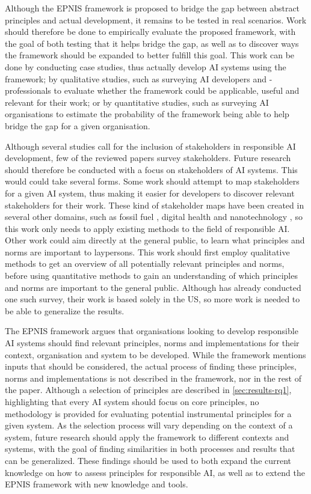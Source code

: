 Although the EPNIS framework is proposed to bridge the gap between abstract principles and actual development, it remains to be tested in real scenarios. Work should therefore be done to empirically evaluate the proposed framework, with the goal of both testing that it helps bridge the gap, as well as to discover ways the framework should be expanded to better fulfill this goal. This work can be done by conducting case studies, thus actually develop AI systems using the framework; by qualitative studies, such as surveying AI developers and -professionals to evaluate whether the framework could be applicable, useful and relevant for their work; or by quantitative studies, such as surveying AI organisations to estimate the probability of the framework being able to help bridge the gap for a given organisation.


Although several studies call for the inclusion of stakeholders in responsible AI development, few of the reviewed papers survey stakeholders. Future research should therefore be conducted with a focus on stakeholders of AI systems. This would could take several forms. Some work should attempt to map stakeholders for a given AI system, thus making it easier for developers to discover relevant stakeholders for their work. These kind of stakeholder maps have been created in several other domains, such as fossil fuel \parencite{Yudha_2018_stakeholdermap}, digital health \parencite{An_2022_stakeholdermap} and nanotechnology \parencite{Hansen_2010_stakeholdermap}, so this work only needs to apply existing methods to the field of responsible AI. Other work could aim directly at the general public, to learn what principles and norms are important to laypersons. This work should first employ qualitative methods to get an overview of all potentially relevant principles and norms, before using quantitative methods to gain an understanding of which principles and norms are important to the general public. Although \textcite{Jakesch_2022} has already conducted one such survey, their work is based solely in the US, so more work is needed to be able to generalize the results.

The EPNIS framework argues that organisations looking to develop responsible AI systems should find relevant principles, norms and implementations for their context, organisation and system to be developed. While the framework mentions inputs that should be considered, the actual process of finding these principles, norms and implementations is not described in the framework, nor in the rest of the paper. Although a selection of principles are described in \autoref{sec:results-rq1}, highlighting that every AI system should focus on core principles, no methodology is provided for evaluating potential instrumental principles for a given system. As the selection process will vary depending on the context of a system, future research should apply the framework to different contexts and systems, with the goal of finding similarities in both processes and results that can be generalized. These findings should be used to both expand the current knowledge on how to assess principles for responsible AI, as well as to extend the EPNIS framework with new knowledge and tools.


